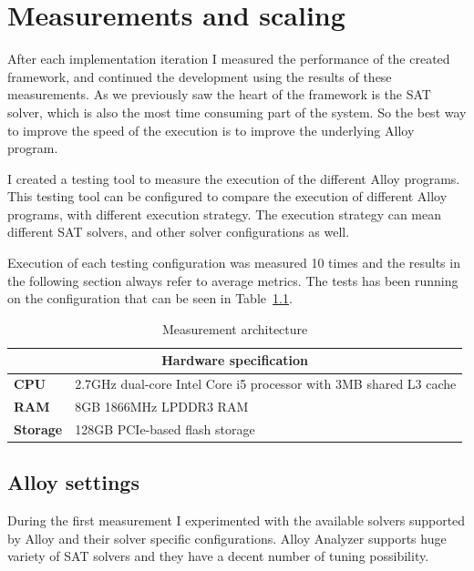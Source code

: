 \chapter{Measurements and scaling}
\label{cha:measurements}

After each implementation iteration I measured the performance of the created framework, and continued the development using the results of these measurements. As we previously saw the heart of the framework is the SAT solver, which is also the most time consuming part of the system. So the best way to improve the speed of the execution is to improve the underlying Alloy program.

I created a testing tool to measure the execution of the different Alloy programs. This testing tool can be configured to compare the execution of different Alloy programs, with different execution strategy. The execution strategy can mean different SAT solvers, and other solver configurations as well.

Execution of each testing configuration was measured 10 times and the results in the following section always refer to average metrics. The tests has been running on the configuration that can be seen in Table~\ref{tab:hardwarespecification}.

\begin{table}[htb]
\begin{center}
\begin{tabular}{p{2cm}p{12cm}}
\toprule
	\multicolumn{2}{c}{\textbf{Hardware specification}}\\\midrule
	\textbf{CPU} & 2.7GHz dual-core Intel Core i5 processor with 3MB shared L3 cache\\
	\textbf{RAM} & 8GB 1866MHz LPDDR3 RAM\\
	\textbf{Storage} & 128GB PCIe-based flash storage\\
\bottomrule
\end{tabular}
\end{center}
\caption{\label{tab:hardwarespecification} Measurement architecture}
\end{table}

\section{Alloy settings}
\label{sec:alloysettings}

During the first measurement I experimented with the available solvers supported by Alloy and their solver specific configurations. Alloy Analyzer supports huge variety of SAT solvers and they have a decent number of tuning possibility.

